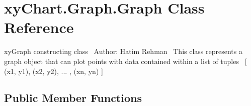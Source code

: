 \hypertarget{classxy_chart_1_1_graph_1_1_graph}{}\section{xy\+Chart.\+Graph.\+Graph Class Reference}
\label{classxy_chart_1_1_graph_1_1_graph}


xy\+Graph constructing class~\newline
 Author\+: Hatim Rehman~\newline
 This class represents a graph object that can plot points with data contained within a list of tuples~\newline
\mbox{[} (x1, y1), (x2, y2), ... , (xn, yn) \mbox{]}  


\subsection*{Public Member Functions}
